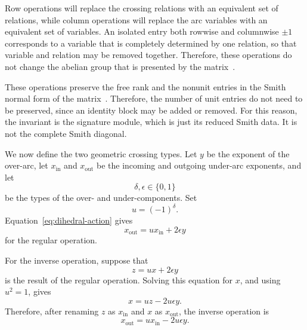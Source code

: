 \documentclass[11pt]{article}
\theoremstyle{definition}
\begin{document}
Row operations will replace the crossing relations with an equivalent set of relations, while column operations will replace the arc variables with an equivalent set of variables. An isolated entry both rowwise and columnwise $\pm1$ corresponds to a variable that is completely determined by one relation, so that variable and relation may be removed together. Therefore, these operations do not change the abelian group that is presented by the matrix~\cite[Theorem~2.3]{stanley}.

These operations preserve the free rank and the nonunit entries in the Smith normal form of the matrix~\cite[Sections~2.1--2.2]{stanley}. Therefore, the number of unit entries do not need to be preserved, since an identity block may be added or removed. For this reason, the invariant is the signature module, which is just its reduced Smith data. It is not the complete Smith diagonal.

We now define the two geometric crossing types. Let $y$ be the exponent of the over-arc, let $x_{\mathrm{in}}$ and $x_{\mathrm{out}}$ be the incoming and outgoing under-arc exponents, and let
\[
\delta,\epsilon\in\{0,1\}
\]
be the types of the over- and under-components. Set
\[
u=(-1)^\delta.
\]
Equation~\eqref{eq:dihedral-action} gives
\[
x_{\mathrm{out}}=ux_{\mathrm{in}}+2\epsilon y
\]
for the regular operation.

For the inverse operation, suppose that
\[
z=ux+2\epsilon y
\]
is the result of the regular operation. Solving this equation for $x$, and using $u^2=1$, gives
\[
x=uz-2u\epsilon y.
\]
Therefore, after renaming $z$ as $x_{\mathrm{in}}$ and $x$ as $x_{\mathrm{out}}$, the inverse operation is
\[
x_{\mathrm{out}}=ux_{\mathrm{in}}-2u\epsilon y.
\]

\begin{table}[H]
\centering
\caption{Regular and inverse crossing relations in exponent form.}
\small
{}
\end{table}
\end{document}

